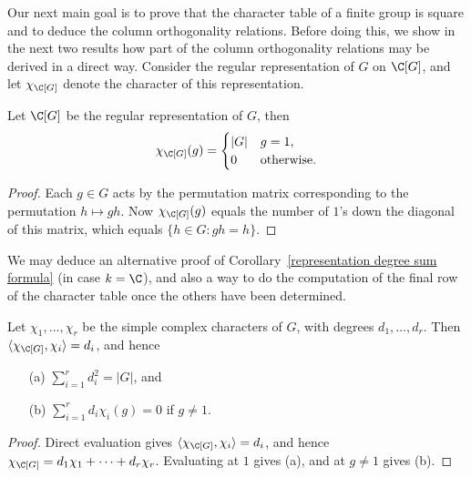 Our next main goal is to prove that the character table of a finite group is square and to deduce the column orthogonality relations. Before doing this, we show in the next two results how part of the column orthogonality relations may be derived in a direct way. Consider the regular representation of $G$ on $\C[G]$, and let $\chi_{\C[G]}$ denote the character of this representation.
\begin{lemma}
Let $\C[G]$ be the regular representation of $G$, then
\[\chi_{\C[G]}(g)=\begin{cases}
|G|&g=1,\\
0&\text{otherwise}.
\end{cases}\]
\end{lemma}
\begin{proof}
Each $g\in G$ acts by the permutation matrix corresponding to the permutation $h\mapsto gh$. Now $\chi_{\C[G]}(g)$ equals the number of $1$'s down the diagonal of this matrix, which equals $\{h\in G:gh=h\}$.
\end{proof}
We may deduce an alternative proof of Corollary~\ref{representation degree sum formula} (in case $k=\C$), and also a way to do the computation of the final row of the character table once the others have been determined.
\begin{corollary}\label{regular representation prop}
Let $\chi_1,\dots,\chi_r$ be the simple complex characters of $G$, with degrees $d_1,\dots,d_r$. Then $\langle\chi_{\C[G]},\chi_i\rangle=d_i$, and hence
\begin{itemize}
\item[(a)] $\sum_{i=1}^{r}d_i^2=|G|$, and
\item[(b)] $\sum_{i=1}^{r}d_i\chi_i(g)=0$ if $g\neq 1$.
\end{itemize}
\end{corollary}
\begin{proof}
Direct evaluation gives $\langle\chi_{\C[G]},\chi_i\rangle=d_i$, and hence $\chi_{\C[G]}=d_1\chi_1+\dots+d_r\chi_r$. Evaluating at $1$ gives (a), and at $g\neq 1$ gives (b).
\end{proof}
